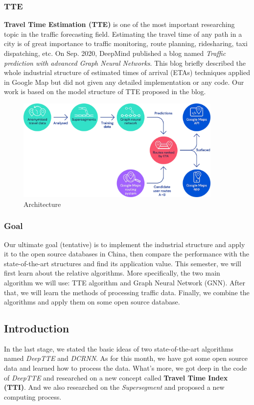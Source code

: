 \documentclass[fontset=none]{ctexart}
\theoremstyle{definition}
\theoremstyle{remark}
\begin{document}
\subsubsection{TTE}
\textbf{Travel Time Estimation (TTE)} is one of the most important researching topic in the traffic forecasting field. 
Estimating the travel time of any path in a city is of great importance to traffic monitoring, route planning, ridesharing, taxi dispatching, etc.
On Sep. 2020, DeepMind published a blog named \textit{Traffic prediction with advanced Graph Neural Networks}. 
This blog briefly described the whole industrial structure of estimated times of arrival (ETAs) techniques applied in Google Map but did not given any detailed implementation or any code.
Our work is based on the model structure of TTE proposed in the blog.
\begin{figure}[htb]
    \centering
    \includegraphics[width=0.9\textwidth]{images/architecture.png}
    \caption{Architecture}
    \label{fig1}
\end{figure}

\subsubsection{Goal}
Our ultimate goal (tentative) is to implement the industrial structure and apply it to the open source databases in China, then compare the performance with the state-of-the-art structures and find its application value.
This semester, we will first learn about the relative algorithms. More specifically, the two main algorithm we will use: TTE algorithm and Graph Neural Network (GNN). After that, we will learn the methods of processing traffic data. Finally, we combine the algorithms and apply them on some open source database.

\subsection{Introduction}
In the last stage, we stated the basic ideas of two state-of-the-art algorithms named \textit{DeepTTE}
and \textit{DCRNN}. As for this month, we have got some open source data and learned how to process the
data. What's more, we got deep in the code of \textit{DeepTTE} and researched on a new concept
called \textbf{Travel Time Index (TTI)}. And we also researched on the \textit{Supersegment} and proposed
a new computing process.
\end{document}
